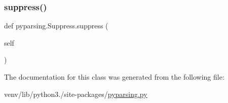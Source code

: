 \mbox{\label{classpyparsing_1_1Suppress_a7c1cd39f8e2c641fb6d34a5fb8f6af2f}} 
\subsubsection{\texorpdfstring{suppress()}{suppress()}}
{\footnotesize\ttfamily def pyparsing.\+Suppress.\+suppress (\begin{DoxyParamCaption}\item[{}]{self }\end{DoxyParamCaption})}



The documentation for this class was generated from the following file\+:\begin{DoxyCompactItemize}
\item 
venv/lib/python3./site-\/packages/\hyperlink{pyparsing_8py}{pyparsing.\+py}\end{DoxyCompactItemize}
